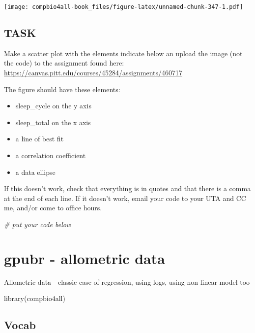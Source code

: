 \documentclass[
]{book}
\newenvironment{Shaded}{\begin{snugshade}}{\end{snugshade}}
\newcommand{\CommentTok}[1]{\textcolor[rgb]{0.56,0.35,0.01}{\textit{#1}}}
\newcommand{\FunctionTok}[1]{\textcolor[rgb]{0.00,0.00,0.00}{#1}}
\newcommand{\NormalTok}[1]{#1}
\providecommand{\tightlist}{%
  \setlength{\itemsep}{0pt}\setlength{\parskip}{0pt}}
\begin{document}
\texttt{[image: compbio4all-book\_files/figure-latex/unnamed-chunk-347-1.pdf]}

\hypertarget{task}{%
\section{TASK}\label{task}}

Make a scatter plot with the elements indicate below an upload the image (not the code) to the assignment found here:
\url{https://canvas.pitt.edu/courses/45284/assignments/460717}

The figure should have these elements:

\begin{itemize}
\tightlist
\item
  sleep\_cycle on the y axis
\item
  sleep\_total on the x axis
\item
  a line of best fit
\item
  a correlation coefficient
\item
  a data ellipse
\end{itemize}

If this doesn't work, check that everything is in quotes and that there is a comma at the end of each line. If it doesn't work, email your code to your UTA and CC me, and/or come to office hours.

\begin{Shaded}
\begin{Highlighting}[]
\CommentTok{\# put your code below}
\end{Highlighting}
\end{Shaded}

\hypertarget{gpubr---allometric-data}{%
\chapter{gpubr - allometric data}\label{gpubr---allometric-data}}

Allometric data - classic case of regression, using logs, using non-linear model too

\begin{Shaded}
\begin{Highlighting}[]
\FunctionTok{library}\NormalTok{(compbio4all)}
\end{Highlighting}
\end{Shaded}

\hypertarget{vocab-1}{%
\section{Vocab}\label{vocab-1}}
\end{document}
